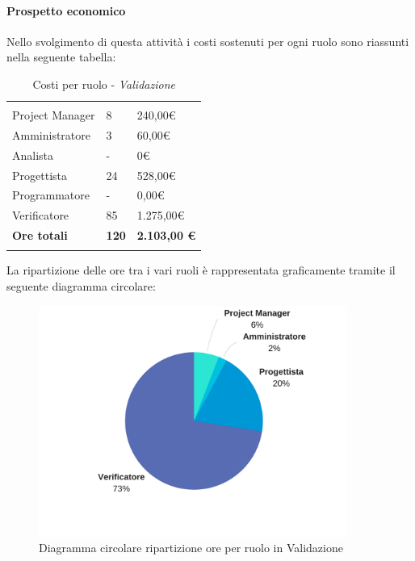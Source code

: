 			\paragraph{Prospetto economico}	\Spazio
			Nello svolgimento di questa attività i costi sostenuti per ogni ruolo sono riassunti nella seguente tabella:
			\begin{table}[H]
				\centering
				\begin{tabular}{|p{4cm}|C{4cm}|C{4cm}|}
					
					 & &\\
					Project Manager & 8 & 240,00\euro \\
					\hline
					Amministratore& 3 & 60,00\euro \\
					\hline
					Analista & - & 0\euro \\
					\hline
					Progettista & 24 & 528,00\euro \\
					\hline
					Programmatore & - & 0,00\euro \\
					\hline
					Verificatore & 85 & 1.275,00\euro \\
					\hline
					\textbf{Ore totali} & \textbf{120} & \textbf{2.103,00 \euro} \\
				\end{tabular}
				\caption{Costi per ruolo - \textit{Validazione}}
			\end{table}
			
			La ripartizione delle ore tra i vari ruoli è rappresentata graficamente tramite il seguente diagramma circolare:
			\begin{figure}[H] 
				\centering 
				\includegraphics[width=0.9\textwidth]{images/CircolareValidazione.png} 
				\caption{Diagramma circolare ripartizione ore per ruolo in Validazione}
				\label{CircolareValidazione}
			\end{figure}
			
